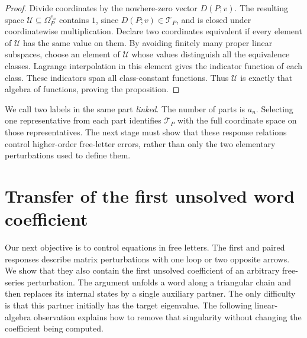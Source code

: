 \documentclass[11pt]{article}
\theoremstyle{definition}
\theoremstyle{remark}
\numberwithin{equation}{section}
\begin{document}
\begin{proof}
Divide coordinates by the nowhere-zero vector $D(P;v)$.  The resulting
space $\mathcal U\subseteq\Omega_P^{e_n}$ contains $1$, since
$D(P;v)\in\mathcal T_P$, and is closed under coordinatewise
multiplication.  Declare two coordinates equivalent if every element
of $\mathcal U$ has the same value on them.  By avoiding finitely
many proper linear subspaces, choose an element of $\mathcal U$
whose values distinguish all the equivalence classes.  Lagrange
interpolation in this element gives the indicator function of each
class.  These indicators span all class-constant functions.  Thus
$\mathcal U$ is exactly that algebra of functions, proving the
proposition.
\end{proof}

We call two labels in the same part \emph{linked}.  The number of
parts is $a_n$.  Selecting one representative from each part
identifies $\mathcal T_P$ with the full coordinate space on those
representatives.  The next stage must show that these response
relations control higher-order free-letter errors, rather than only
the two elementary perturbations used to define them.

\section{Transfer of the first unsolved word coefficient}
\label{sec:word-transfer}

Our next objective is to control equations in free letters.  The first and
paired responses describe matrix perturbations with one loop or two opposite
arrows.  We show that they also contain the first unsolved coefficient of an
arbitrary free-series perturbation.  The argument unfolds a word along a
triangular chain and then replaces its internal states by a single auxiliary
partner.  The only difficulty is that this partner initially has the target
eigenvalue.  The following linear-algebra observation explains how to remove
that singularity without changing the coefficient being computed.
\end{document}
